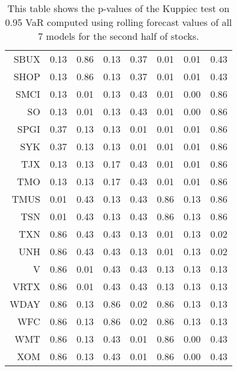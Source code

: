 \begin{table}[ht]
\begin{tabular}{rrrrrrrr}
  SBUX & 0.13 & 0.86 & 0.13 & 0.37 & 0.01 & 0.01 & 0.43 \\ 
  SHOP & 0.13 & 0.86 & 0.13 & 0.37 & 0.01 & 0.01 & 0.43 \\ 
  SMCI & 0.13 & 0.01 & 0.13 & 0.43 & 0.01 & 0.00 & 0.86 \\ 
  SO & 0.13 & 0.01 & 0.13 & 0.43 & 0.01 & 0.00 & 0.86 \\ 
  SPGI & 0.37 & 0.13 & 0.13 & 0.01 & 0.01 & 0.01 & 0.86 \\ 
  SYK & 0.37 & 0.13 & 0.13 & 0.01 & 0.01 & 0.01 & 0.86 \\ 
  TJX & 0.13 & 0.13 & 0.17 & 0.43 & 0.01 & 0.01 & 0.86 \\ 
  TMO & 0.13 & 0.13 & 0.17 & 0.43 & 0.01 & 0.01 & 0.86 \\ 
  TMUS & 0.01 & 0.43 & 0.13 & 0.43 & 0.86 & 0.13 & 0.86 \\ 
  TSN & 0.01 & 0.43 & 0.13 & 0.43 & 0.86 & 0.13 & 0.86 \\ 
  TXN & 0.86 & 0.43 & 0.43 & 0.13 & 0.01 & 0.13 & 0.02 \\ 
  UNH & 0.86 & 0.43 & 0.43 & 0.13 & 0.01 & 0.13 & 0.02 \\ 
  V & 0.86 & 0.01 & 0.43 & 0.43 & 0.13 & 0.13 & 0.13 \\ 
  VRTX & 0.86 & 0.01 & 0.43 & 0.43 & 0.13 & 0.13 & 0.13 \\ 
  WDAY & 0.86 & 0.13 & 0.86 & 0.02 & 0.86 & 0.13 & 0.13 \\ 
  WFC & 0.86 & 0.13 & 0.86 & 0.02 & 0.86 & 0.13 & 0.13 \\ 
  WMT & 0.86 & 0.13 & 0.43 & 0.01 & 0.86 & 0.00 & 0.43 \\ 
  XOM & 0.86 & 0.13 & 0.43 & 0.01 & 0.86 & 0.00 & 0.43 \\ 
   \hline
\end{tabular}
\caption[Kupiec test p-values, alpha =0.95 (2)]{This table shows the p-values of the Kuppiec test on 0.95 VaR computed using rolling forecast values of all 7 models for the second half of stocks.} 
\label{Table:Kupiec_test_rolling_0.95_2}
\end{table}
